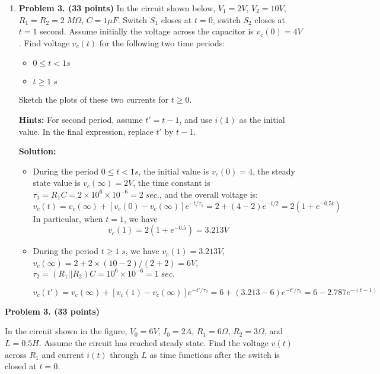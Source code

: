 \begin{enumerate}
\begin{itemize}
  \end{itemize} 

\item {\bf Problem 3. (33 points)} In the circuit shown below, $V_1=2V$,
  $V_2=10V$, $R_1=R_2=2\;M\Omega$, $C=1\mu F$. Switch $S_1$ closes at $t=0$, 
  switch $S_2$ closes at $t=1$ second. Assume initially the voltage across
  the capacitor is $v_c(0)=4V$. Find voltage $v_c(t)$ for the following 
  two time periods:
  \begin{itemize}
  \item $0\le t < 1 s$
  \item $t \ge 1\;s$ 
  \end{itemize}
  Sketch the plots of these two currents for $t \ge 0$.
  
  {\bf Hints:} For second period, assume $t'=t-1$, and use $i(1)$ as 
  the initial value. In the final expression, replace $t'$ by $t-1$.


 {\bf Solution:}
 \begin{itemize}
 \item During the period $0\le t<1 s$, the initial value is 
	$v_c(0)=4$, the steady state value is $v_c(\infty)=2V$, the time 
	constant is $\tau_1=R_1C=2\times 10^6\times 10^{-6}=2\;sec.$, and 
	the overall voltage is:
\[ v_c(t)=v_c(\infty)+[v_c(0)-v_c(\infty)] e^{-t/\tau_1}
	=2+(4-2) e^{-t/2}=2(1+e^{-0.5t})	\]
 In particular, when $t=1$, we have
 \[ v_c(1)=2(1+e^{-0.5})=3.213V	\]
 
 \item During the period $t \ge 1\;s$, we have $v_c(1)=3.213V$, 
 	$v_c(\infty)=2+2\times (10-2)/(2+2)=6V$,
 	$\tau_2=(R_1||R_2)C=10^6 \times 10^{-6}=1\; sec.$

 \[	v_c(t')=v_c(\infty)+[v_c(1)-v_c(\infty)]e^{-t'/\tau_2}
 	=6+(3.213-6)e^{-t'/\tau_2}=6-2.787e^{-(t-1)} \]

 
 \end{itemize}




\end{enumerate}



\item {\bf Problem 3. (33 points)} 

In the circuit shown in the figure, $V_0=6V$, $I_0=2A$, $R_1=6\Omega$, 
$R_2=3\Omega$, and $L=0.5H$. Assume the circuit has reached steady state.
Find the voltage $v(t)$ across $R_1$ and current $i(t)$ through $L$ as 
time functions after the switch is closed at $t=0$.


